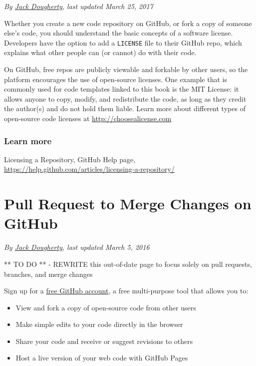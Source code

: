 \documentclass[
  english,
]{book}
\providecommand{\tightlist}{%
  \setlength{\itemsep}{0pt}\setlength{\parskip}{0pt}}
\begin{document}
\emph{By \href{authors}{Jack Dougherty}, last updated March 25, 2017}

Whether you create a new code repository on GitHub, or fork a copy of someone else's code, you should understand the basic concepts of a software license. Developers have the option to add a \texttt{LICENSE} file to their GitHub repo, which explains what other people can (or cannot) do with their code.

On GitHub, free repos are publicly viewable and forkable by other users, so the platform encourages the use of open-source licenses. One example that is commonly used for code templates linked to this book is the MIT License: it allows anyone to copy, modify, and redistribute the code, as long as they credit the author(s) and do not hold them liable. Learn more about different types of open-source code licenses at \url{http://choosealicense.com}

\hypertarget{learn-more-17}{%
\subsubsection*{Learn more}\label{learn-more-17}}

Licensing a Repository, GitHub Help page, \url{https://help.github.com/articles/licensing-a-repository/}

\hypertarget{pull-request}{%
\section{Pull Request to Merge Changes on GitHub}\label{pull-request}}

\emph{By \href{authors}{Jack Dougherty}, last updated March 5, 2016}

** TO DO **
- REWRITE this out-of-date page to focus solely on pull requests, branches, and merge changes

Sign up for a \href{http://github.com}{free GitHub account}, a free multi-purpose tool that allows you to:

\begin{itemize}
\tightlist
\item
  View and fork a copy of open-source code from other users
\item
  Make simple edits to your code directly in the browser
\item
  Share your code and receive or suggest revisions to others
\item
  Host a live version of your web code with GitHub Pages
\end{itemize}
\end{document}
